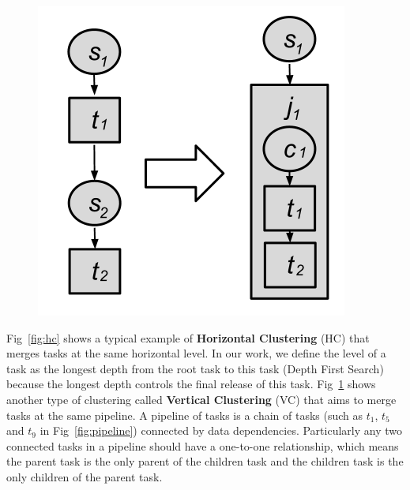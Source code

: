 
\begin{figure}
\centering
  \includegraphics[height=0.4\linewidth]{figures/balance/vc.png}
  \label{fig:vc}
\end{figure}



Fig~\ref{fig:hc} shows a typical example of \textbf{Horizontal Clustering} (HC) that merges tasks at the same horizontal level. In our work, we define the level of a task as the longest depth from the root task to this task (Depth First Search) because the longest depth controls the final release of this task. Fig~\ref{fig:vc} shows another type of clustering called \textbf{Vertical Clustering} (VC) that aims to merge tasks at the same pipeline. A pipeline of tasks is a chain of tasks (such as $t_1$, $t_5$ and $t_9$ in Fig~\ref{fig:pipeline}) connected by data dependencies. Particularly any two connected tasks in a pipeline should have a one-to-one relationship, which means the parent task is the only parent of the children task and the children task is the only children of the parent task. 

